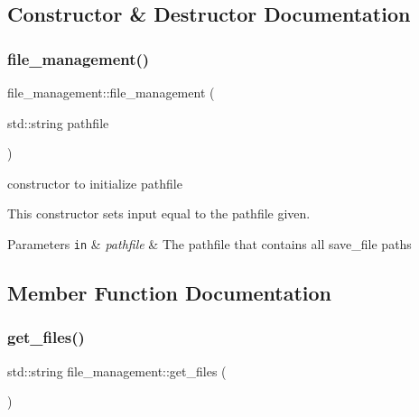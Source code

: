 \subsection{Constructor \& Destructor Documentation}
\mbox{\label{classfile__management_ae3d7ca2804b44e05efc2ddc79c9d514d}} 
\subsubsection{\texorpdfstring{file\+\_\+management()}{file\_management()}}
{\footnotesize\ttfamily file\+\_\+management\+::file\+\_\+management (\begin{DoxyParamCaption}\item[{std\+::string}]{pathfile }\end{DoxyParamCaption})}



constructor to initialize pathfile 

This constructor sets input equal to the pathfile given.


\begin{DoxyParams}[1]{Parameters}
\mbox{\tt in}  & {\em pathfile} & The pathfile that contains all save\+\_\+file paths \\
\hline
\end{DoxyParams}


\subsection{Member Function Documentation}
\mbox{\label{classfile__management_a6c3f90ce958156adea878510097d64ef}} 
\subsubsection{\texorpdfstring{get\+\_\+files()}{get\_files()}}
{\footnotesize\ttfamily std\+::string file\+\_\+management\+::get\+\_\+files (\begin{DoxyParamCaption}{ }\end{DoxyParamCaption})}



